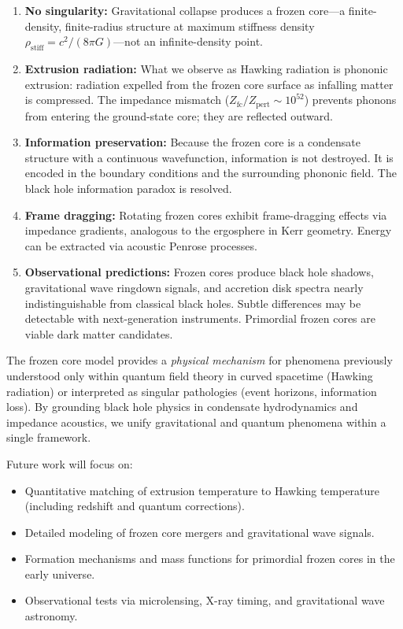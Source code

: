 \documentclass[12pt,a4paper]{article}
\newcommand{\rhostiff}{\rho_\text{stiff}}
\newcommand{\Zfc}{Z_\text{fc}}
\newcommand{\Zpert}{Z_\text{pert}}
\theoremstyle{definition}
\begin{document}
\begin{enumerate}
  \item \textbf{No singularity:} Gravitational collapse produces a frozen core—a finite-density, finite-radius structure at maximum stiffness density $\rhostiff = c^2/(8\pi G)$—not an infinite-density point.

  \item \textbf{Extrusion radiation:} What we observe as Hawking radiation is phononic extrusion: radiation expelled from the frozen core surface as infalling matter is compressed. The impedance mismatch ($\Zfc/\Zpert \sim 10^{52}$) prevents phonons from entering the ground-state core; they are reflected outward.

  \item \textbf{Information preservation:} Because the frozen core is a condensate structure with a continuous wavefunction, information is not destroyed. It is encoded in the boundary conditions and the surrounding phononic field. The black hole information paradox is resolved.

  \item \textbf{Frame dragging:} Rotating frozen cores exhibit frame-dragging effects via impedance gradients, analogous to the ergosphere in Kerr geometry. Energy can be extracted via acoustic Penrose processes.

  \item \textbf{Observational predictions:} Frozen cores produce black hole shadows, gravitational wave ringdown signals, and accretion disk spectra nearly indistinguishable from classical black holes. Subtle differences may be detectable with next-generation instruments. Primordial frozen cores are viable dark matter candidates.
\end{enumerate}

The frozen core model provides a \emph{physical mechanism} for phenomena previously understood only within quantum field theory in curved spacetime (Hawking radiation) or interpreted as singular pathologies (event horizons, information loss). By grounding black hole physics in condensate hydrodynamics and impedance acoustics, we unify gravitational and quantum phenomena within a single framework.

Future work will focus on:
\begin{itemize}
  \item Quantitative matching of extrusion temperature to Hawking temperature (including redshift and quantum corrections).
  \item Detailed modeling of frozen core mergers and gravitational wave signals.
  \item Formation mechanisms and mass functions for primordial frozen cores in the early universe.
  \item Observational tests via microlensing, X-ray timing, and gravitational wave astronomy.
\end{itemize}
\end{document}
